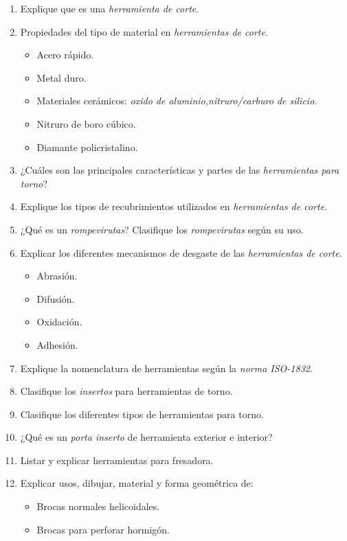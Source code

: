 \documentclass[a4paper]{article}
\begin{document}
\begin{enumerate}
    \item Explique que es una \textit{herramienta de corte}.
   \item Propiedades del tipo de material en \textit{herramientas de corte}.
   \begin{itemize}
    \item Acero rápido.
    \item Metal duro.
    \item Materiales cerámicos: \textit{oxido de aluminio,nitruro/carburo de silicio}.
    \item Nitruro de boro cúbico.
    \item Diamante policristalino.
  \end{itemize}
   \item ¿Cuáles son las principales características y partes de las \textit{herramientas para torno}?
    \item Explique los tipos de recubrimientos utilizados en \textit{herramientas de corte}.
    \item ¿Qué es un \textit{rompevirutas}? Clasifique los \textit{rompevirutas} según su uso.
    \item Explicar los diferentes mecanismos de desgaste de las \textit{herramientas de corte}.
    \begin{itemize}
      \item Abrasión.
      \item Difusión.
      \item Oxidación.
      \item Adhesión.
    \end{itemize}
    \item Explique la nomenclatura de herramientas según la \textit{norma ISO-1832}.
    \item Clasifique los \textit{insertos} para herramientas de torno.
    \item Clasifique los diferentes tipos de herramientas para torno.
    \item ¿Qué es un \textit{porta inserto} de herramienta exterior e interior?
    \item Listar y explicar herramientas para fresadora.
    \item Explicar usos, dibujar, material y forma geométrica de:
    \begin{itemize}
      \item Brocas normales helicoidales.
      \item Brocas para perforar hormigón.

\end{itemize}
\end{enumerate}
\end{document}
